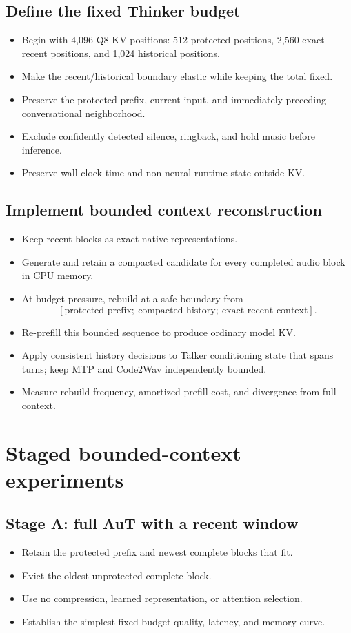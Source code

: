 \documentclass[10pt,letterpaper]{article}
\begin{document}
\subsection{Define the fixed Thinker budget}
\begin{itemize}
    \item Begin with 4,096 Q8 KV positions: 512 protected positions, 2,560 exact recent positions, and 1,024 historical positions.
    \item Make the recent/historical boundary elastic while keeping the total fixed.
    \item Preserve the protected prefix, current input, and immediately preceding conversational neighborhood.
    \item Exclude confidently detected silence, ringback, and hold music before inference.
    \item Preserve wall-clock time and non-neural runtime state outside KV.
\end{itemize}

\subsection{Implement bounded context reconstruction}
\begin{itemize}
    \item Keep recent blocks as exact native representations.
    \item Generate and retain a compacted candidate for every completed audio block in CPU memory.
    \item At budget pressure, rebuild at a safe boundary from
    \[
    [\text{protected prefix};\ \text{compacted history};\ \text{exact recent context}].
    \]
    \item Re-prefill this bounded sequence to produce ordinary model KV.
    \item Apply consistent history decisions to Talker conditioning state that spans turns; keep MTP and Code2Wav independently bounded.
    \item Measure rebuild frequency, amortized prefill cost, and divergence from full context.
\end{itemize}

\section{Staged bounded-context experiments}

\subsection{Stage A: full AuT with a recent window}
\begin{itemize}
    \item Retain the protected prefix and newest complete blocks that fit.
    \item Evict the oldest unprotected complete block.
    \item Use no compression, learned representation, or attention selection.
    \item Establish the simplest fixed-budget quality, latency, and memory curve.
\end{itemize}
\end{document}
